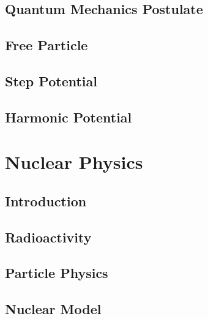 \documentclass[10pt]{report}
\begin{document}
\section{Quantum Mechanics Postulate}
\clearpage
\clearpage

\section{Free Particle}
\clearpage

\section{Step Potential}
\clearpage

\section{Harmonic Potential}
\clearpage

\chapter{Nuclear Physics}\clearpage
\section{Introduction}
\clearpage

\section{Radioactivity}
\clearpage

\section{Particle Physics}
\clearpage

\section{Nuclear Model}
\clearpage

\nocite{*}
\printbibliography
\end{document}
